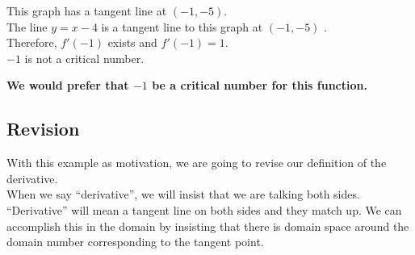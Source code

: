 \documentclass{ximera}
\begin{document}
This graph has a tangent line at $(-1,-5)$.  \\

The line $y = x - 4$ is a tangent line to this graph at $(-1,-5)$ . \\

Therefore, $f'(-1)$ exists and $f'(-1) = 1$.  \\

$-1$ is not a critical number. \\


\begin{center}
\textbf{\textcolor{red!80!black}{We would prefer that $-1$ be a critical number for this function.}}
\end{center}














\subsection*{Revision}


With this example as motivation, we are going to revise our definition of the derivative. \\


When we say ``derivative'', we will insist that we are talking both sides.  ``Derivative'' will mean a tangent line on both sides and they match up.  We can accomplish this in the domain by insisting that there is domain space around the domain number corresponding to the tangent point. \\
\end{document}

